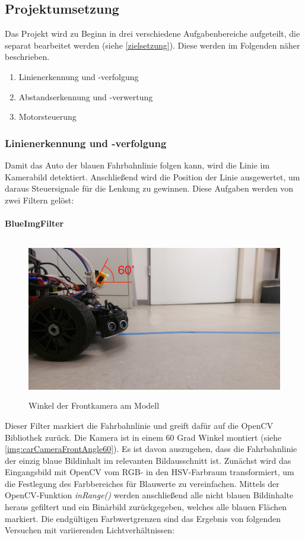 \documentclass[12pt, a4paper]{scrartcl}
\begin{document}
\subsection{Projektumsetzung}

Das Projekt wird zu Beginn in drei verschiedene Aufgabenbereiche aufgeteilt, die separat bearbeitet werden (siehe \autoref{zielsetzung}). Diese werden im Folgenden näher beschrieben.

\begin{enumerate}
	\item Linienerkennung und -verfolgung
	\item Abstandserkennung und -verwertung
	\item Motorsteuerung
\end{enumerate}

\subsubsection{Linienerkennung und -verfolgung}
Damit das Auto der blauen Fahrbahnlinie folgen kann, wird die Linie im Kamerabild detektiert. Anschließend wird die Position der Linie ausgewertet, um daraus Steuersignale für die Lenkung zu gewinnen. Diese Aufgaben werden von zwei Filtern gelöst:

\paragraph{BlueImgFilter}
\begin{figure}[h]
	\centering
	\includegraphics[width=\textwidth, height=7cm, keepaspectratio]{Bilder/carCameraFrontAngle60.jpg}
	\caption{Winkel der Frontkamera am Modell}
	\label{img:carCameraFrontAngle60}
\end{figure}

Dieser Filter markiert die Fahrbahnlinie und greift dafür auf die OpenCV Bibliothek zurück. Die Kamera ist in einem 60 Grad Winkel montiert (siehe \autoref{img:carCameraFrontAngle60}). Es ist davon auszugehen, dass die Fahrbahnlinie der einzig blaue Bildinhalt im relevanten Bildausschnitt ist. Zunächst wird das Eingangsbild mit OpenCV vom RGB- in den HSV-Farbraum transformiert, um die Festlegung des Farbbereiches für Blauwerte zu vereinfachen. Mittels der OpenCV-Funktion \emph{inRange()} werden anschließend alle nicht blauen Bildinhalte heraus gefiltert und ein Binärbild zurückgegeben, welches alle blauen Flächen markiert. Die endgültigen Farbwertgrenzen sind das Ergebnis von folgenden Versuchen mit variierenden Lichtverhältnissen:
\end{document}
